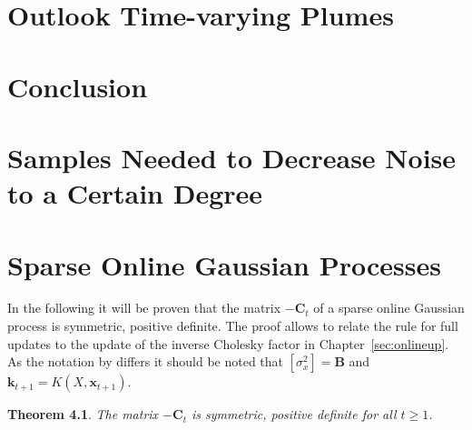 \documentclass[11pt,a4paper,twoside,BCOR=15mm]{scrbook}
\newtheorem{theorem}{Theorem}
\newcommand{\vc}[1]{\bm{#1}}
\newcommand{\mat}[1]{\bm{#1}}
\newcommand{\Tr}{^{\top}}
\begin{document}
\tableofcontents


\printglossary[title={Symbols and Notation}]

\printglossary[type=\acronymtype]

\mainmatter{}







\chapter{Outlook Time-varying Plumes}

\chapter{Conclusion}

\appendix
\chapter{Samples Needed to Decrease Noise to a Certain 
    Degree}\label{sec:decnoise}

\chapter{Sparse Online Gaussian Processes}\label{sec:sparse-gp-apdx}
In the following it will be proven that the matrix $-\mat C_t$ of a sparse 
online Gaussian process \parencite{Csato:2002fp} is symmetric, positive 
definite. The proof allows to relate the rule for full updates to the update of 
the inverse Cholesky factor in Chapter~\ref{sec:onlineup}. As the notation by 
\textcite{Csato:2002fp} differs it should be noted that $[\sigma_x^2] = \mat B$ 
and $\vc k_{t+1} = K(X, {\vc x_{t+1}})$.

\begin{theorem}
    The matrix $-\mat C_t$ is symmetric, positive definite for all $t \geq 1$.
\end{theorem}

\end{document}

